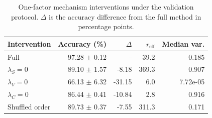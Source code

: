 \begin{table}[H]
\centering
\small
\caption{One-factor mechanism interventions under the \TeReLOffline{} validation protocol. $\Delta$ is the accuracy difference from the full method in percentage points.}
\label{tab:mechanism-audit}
\begin{tabular}{lrrrr}
\toprule
Intervention & Accuracy (\%) & $\Delta$ & $r_{\mathrm{eff}}$ & Median var. \\
\midrule
Full \TeReLOffline{} & 97.28 $\pm$ 0.12 & -- & 39.2 & 0.185 \\
$\lambda_S=0$ & 89.10 $\pm$ 1.57 & -8.18 & 369.3 & 0.907 \\
$\lambda_V=0$ & 66.13 $\pm$ 6.32 & -31.15 & 6.0 & 7.72e-05 \\
$\lambda_C=0$ & 86.44 $\pm$ 0.41 & -10.84 & 2.8 & 0.916 \\
Shuffled order & 89.73 $\pm$ 0.37 & -7.55 & 311.3 & 0.171 \\
\bottomrule
\end{tabular}
\end{table}
